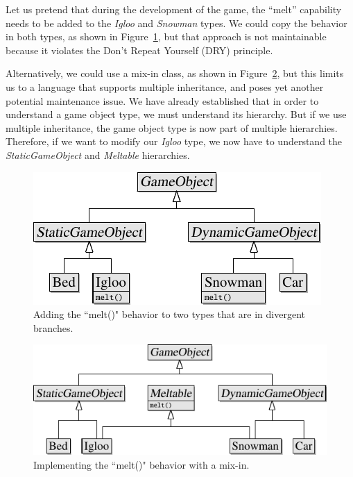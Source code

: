 \documentclass[
    phd,
    electronic,
    letterpaper,
    simplechapterheading,
    openany,
    parttop,
    lof,
]{byumsphd}
\begin{document}
Let us pretend that during the development of the game, the ``melt'' capability needs to be added to the \textit{Igloo} and \textit{Snowman} types. We could copy the behavior in both types, as shown in Figure~\ref{fig:hierarchy:2}, but that approach is not maintainable because it violates the Don't Repeat Yourself  (DRY) principle.

Alternatively, we could use a mix-in class, as shown in Figure~\ref{fig:hierarchy:3}, but this limits us to a language that supports multiple inheritance, and poses yet another potential maintenance issue. We have already established that in order to understand a game object type, we must understand its hierarchy. But if we use multiple inheritance, the game object type is now part of multiple hierarchies. Therefore, if we want to modify our \textit{Igloo} type, we now have to understand the \textit{StaticGameObject} and \textit{Meltable} hierarchies.

\begin{figure}[H]
\bigskip
\centering
\includegraphics[width=0.8\linewidth]{hierarchy-uml-diagrams/hierarchy-2.pdf}
\caption{Adding the ``melt()" behavior to two types that are in divergent branches.}
\label{fig:hierarchy:2}
\end{figure}

\begin{figure}[H]
\bigskip
\centering
\includegraphics[width=\linewidth]{hierarchy-uml-diagrams/hierarchy-3.pdf}
\caption{Implementing the ``melt()" behavior with a mix-in.}
\label{fig:hierarchy:3}
\end{figure}
\end{document}
